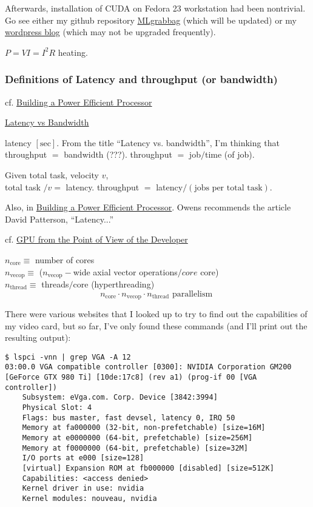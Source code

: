 \documentclass[10pt]{amsart}
\begin{document}
\begin{multicols*}{2}
Afterwards, installation of CUDA on Fedora 23 workstation had been nontrivial.  Go see either my github repository \href{https://github.com/ernestyalumni/MLgrabbag/blob/master/README.md}{MLgrabbag} (which will be updated) or my \href{https://ernestyalumni.wordpress.com/2016/05/07/fedora-23-workstation-linuxnvidia-geforce-gtx-980-ti-my-experience-log-of-what-i-do-and-find-out/#CUDAinstall}{wordpress blog} (which may not be upgraded frequently).  


$P=VI = I^2R$ heating.

\subsubsection{Definitions of Latency and throughput (or bandwidth)}

cf. 
\href{https://classroom.udacity.com/courses/cs344/lessons/55120467/concepts/669874580923}{Building a Power Efficient Processor}

\href{https://classroom.udacity.com/courses/cs344/lessons/55120467/concepts/667559300923}{Latency vs Bandwidth}

latency $[\text{sec}]$.  From the title ``Latency vs. bandwidth'', I'm thinking that throughput $=$ bandwidth (???).  throughput $ = $ job$/$time (of job).  

Given total task, velocity $v$, \\
total task $/v = $ latency.  throughput $=$ latency$/(\text{jobs per total task})$.  


Also, in \href{https://classroom.udacity.com/courses/cs344/lessons/55120467/concepts/669874580923}{Building a Power Efficient Processor}.  Owens recommends the article David Patterson, ``Latency...''

cf. \href{https://classroom.udacity.com/courses/cs344/lessons/55120467/concepts/671181630923}{GPU from the Point of View of the Developer}

$n_{\text{core}} \equiv $ number of cores \\
$n_{\text{vecop}} \equiv$ ($n_{\text{vecop}}-$wide axial vector operations$/core$ core) \\
$n_{\text{thread}} \equiv $ threads$/$core (hyperthreading)
\[
n_{\text{core}} \cdot n_{\text{vecop}} \cdot n_{\text{thread}}  \text{ parallelism  }
\]

There were various websites that I looked up to try to find out the capabilities of my video card, but so far, I've only found these commands (and I'll print out the resulting output):
{\scriptsize
\begin{lstlisting}
$ lspci -vnn | grep VGA -A 12
03:00.0 VGA compatible controller [0300]: NVIDIA Corporation GM200 [GeForce GTX 980 Ti] [10de:17c8] (rev a1) (prog-if 00 [VGA controller])
	Subsystem: eVga.com. Corp. Device [3842:3994]
	Physical Slot: 4
	Flags: bus master, fast devsel, latency 0, IRQ 50
	Memory at fa000000 (32-bit, non-prefetchable) [size=16M]
	Memory at e0000000 (64-bit, prefetchable) [size=256M]
	Memory at f0000000 (64-bit, prefetchable) [size=32M]
	I/O ports at e000 [size=128]
	[virtual] Expansion ROM at fb000000 [disabled] [size=512K]
	Capabilities: <access denied>
	Kernel driver in use: nvidia
	Kernel modules: nouveau, nvidia


\end{lstlisting}}
\end{multicols*}
\end{document}
